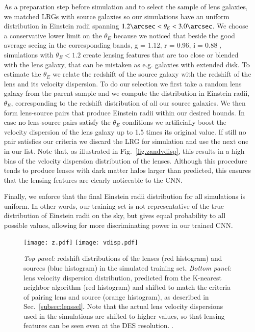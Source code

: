 \documentclass[tradiabstract,twocolumn]{aa}
\begin{document}
As a preparation step before simulation and to select the sample of lens galaxies, we matched LRGs with source galaxies so our simulations have an uniform distribution in Einstein radii spanning $1.2\arcsec < \theta_E < 3.0\arcsec$. We choose a conservative lower limit on the $\theta_E$ because we noticed that beside the good average seeing in the corresponding bands, g = 1.12, r = 0.96, i = 0.88 \citep{Abbott2018}, simulations with $\theta_E < 1.2$ create lensing features that are too close or blended with the lens galaxy, that can be mistaken as e.g. galaxies with extended disk. To estimate the $\theta_E$  we relate the redshift of the source galaxy with the redshift of the lens and its velocity dispersion. To do our selection  we first take a random lens galaxy from the parent sample and we compute the distribution in Einstein radii, $\theta_E$, corresponding to the redshift distribution of all our source galaxies. We then form lens-source pairs that produce Einstein radii within our desired bounds. In case no lens-source pairs satisfy the $\theta_E$ conditions we artificially boost the velocity dispersion of the lens galaxy up to 1.5 times its original value. If still no pair satisfies our criteria we discard the LRG for simulation and use the next one in our list. Note that, as illustrated in Fig.~\ref{fig.zandvdisp}, this results in a high bias of the velocity dispersion distribution of the lenses. Although this procedure tends to produce lenses with dark matter halos larger than predicted, this ensures that the lensing features are clearly noticeable to the CNN.

Finally, we enforce that the final Einstein radii distribution for all simulations is uniform. In other words, our training set is not representative of the true distribution of Einstein radii on the sky, but gives equal probability to all possible values, allowing for more discriminating power in our trained CNN.

\begin{figure}[h!]
\centering
\texttt{[image: z.pdf]}
\texttt{[image: vdisp.pdf]}
\caption{{\it Top panel:} redshift distributions of the lenses (red histogram) and sources (blue histogram) in the simulated training set. {\it Bottom panel:} lens velocity dispersion distribution, predicted from the K-nearest neighbor algorithm (red histogram) and shifted to match the criteria of pairing lens and source (orange histogram), as described in Sec.~\ref{subsec:lenssel}. Note that the actual lens velocity dispersions used in the simulations are shifted to higher values, so that lensing features can be seen even at the DES resolution. \label{fig.zandvdisp}.}
\label{FigGam}%
\end{figure}
\end{document}
